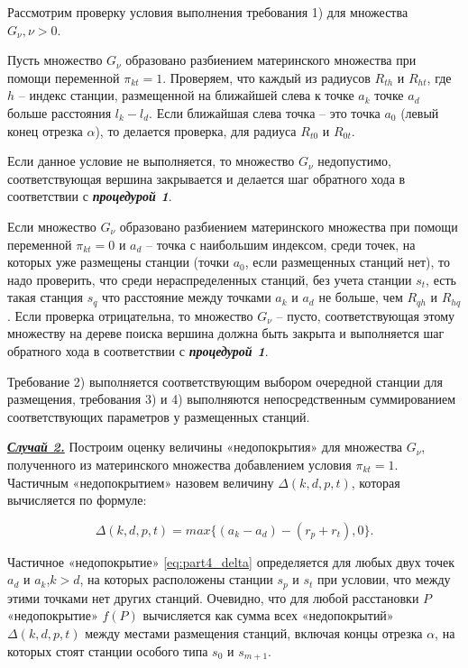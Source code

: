 Рассмотрим проверку условия выполнения требования 1) для множества $G_\nu, \nu > 0$. 

Пусть множество $G_\nu$  образовано разбиением материнского множества при помощи переменной $\pi_{kt}=1$. Проверяем, что каждый из радиусов $R_{th}$ и $R_{ht}$, где $h$ – индекс станции, размещенной на ближайшей слева к точке $a_k$ точке $a_d$ больше расстояния $l_k-l_d$. Если ближайшая слева точка – это точка $a_0$ (левый конец отрезка $\alpha$), то делается проверка, для радиуса $R_{t0}$ и $R_{0t}$. 

Если данное условие не выполняется, то множество $G_\nu$ недопустимо, соответствующая вершина закрывается и делается шаг обратного хода в соответствии с \textit{\textbf{процедурой 1}}. 

Если множество $G_\nu$ образовано разбиением материнского множества при помощи переменной $\pi_{kt}=0$ и $a_d$ -- точка с наибольшим индексом, среди точек, на которых уже размещены станции (точки $a_0$, если размещенных станций нет), то надо проверить, что среди нераспределенных станций, без учета станции $s_t$, есть такая станция $s_q$ что расстояние между точками $a_k$ и $a_d$ не больше, чем $R_{qh}$ и $R_{hq}$. Если проверка отрицательна, то множество $G_\nu$ -- пусто, соответствующая этому множеству на дереве поиска вершина должна быть закрыта и выполняется шаг обратного хода в соответствии с  \textit{\textbf{процедурой 1}}.

Требование 2) выполняется соответствующим выбором очередной станции для размещения, требования 3) и 4) выполняются непосредственным суммированием соответствующих параметров у размещенных станций.

\underline{\textit{\textbf{Случай 2.}}}
Построим оценку величины «недопокрытия» для множества $G_\nu$, полученного из материнского множества добавлением условия $\pi_{kt}=1$. Частичным «недопокрытием» назовем величину $\Delta(k,d,p,t)$, которая вычисляется по формуле:

\begin{equation}\label{eq:part4_delta}
\Delta(k,d,p,t) = max\{\left(a_{k} - a_{d} \right) - \left(r_{p} + r_{t} \right), 0\}.
\end{equation}

Частичное «недопокрытие» \cref{eq:part4_delta} определяется для любых двух точек $a_d$ и $a_k$,$k>d$, на которых расположены станции $s_p$ и $s_t$ при условии, что между этими точками нет других станций. Очевидно, что для любой расстановки $P$ «недопокрытие» $f(P)$ вычисляется как сумма всех «недопокрытий» $\Delta(k,d,p,t)$ между местами размещения станций, включая концы отрезка $\alpha$, на которых стоят станции особого типа $s_0$ и $s_{m+1}$.


